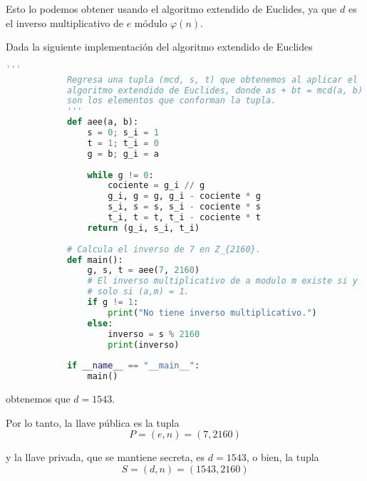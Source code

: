 \documentclass[letterpaper,11pt]{article}
\begin{document}
\begin{enumerate}
\begin{enumerate}
\begin{itemize}
            Esto lo podemos obtener usando el algoritmo extendido de Euclides,
            ya que $d$ es el inverso multiplicativo de $e$ módulo $\varphi(n)$.
            
            Dada la siguiente implementación del algoritmo extendido de Euclides
            \begin{lstlisting}[language=Python]
            '''
            Regresa una tupla (mcd, s, t) que obtenemos al aplicar el 
            algoritmo extendido de Euclides, donde as + bt = mcd(a, b) 
            son los elementos que conforman la tupla.
            '''
            def aee(a, b):
                s = 0; s_i = 1
                t = 1; t_i = 0
                g = b; g_i = a
            
                while g != 0:
                    cociente = g_i // g
                    g_i, g = g, g_i - cociente * g
                    s_i, s = s, s_i - cociente * s
                    t_i, t = t, t_i - cociente * t
                return (g_i, s_i, t_i)
            
            # Calcula el inverso de 7 en Z_{2160}.
            def main():
                g, s, t = aee(7, 2160)
                # El inverso multiplicativo de a modulo m existe si y 
                # solo si (a,m) = 1.
                if g != 1:
                    print("No tiene inverso multiplicativo.")
                else:
                    inverso = s % 2160
                    print(inverso)
                
            if __name__ == "__main__":
                main()
            \end{lstlisting}
            
            obtenemos que $d = 1543$. 
            
            Por lo tanto, la llave pública es la tupla
            \begin{equation*}
                P = (e, n) = (7, 2160)
            \end{equation*}
            
            y la llave privada, que se mantiene secreta, es $d = 1543$, o bien,
            la tupla
            \begin{equation*}
                S = (d, n) = (1543, 2160)
            \end{equation*}
        

\end{itemize}
\end{enumerate}
\end{enumerate}
\end{document}
